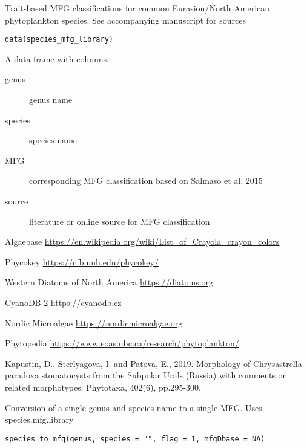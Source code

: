 \documentclass[a4paper]{book}
\begin{document}
%
\begin{Description}\relax
Trait-based MFG classifications for common Eurasion/North American phytoplankton species.
See accompanying manuscript for sources
\end{Description}
%
\begin{Usage}
\begin{verbatim}
data(species_mfg_library)
\end{verbatim}
\end{Usage}
%
\begin{Format}
A data frame with columns:
\begin{description}

\item[genus] genus name
\item[species] species name
\item[MFG] corresponding MFG classification based on Salmaso et al. 2015
\item[source] literature or online source for MFG classification

\end{description}

\end{Format}
%
\begin{References}\relax
Algaebase \url{https://en.wikipedia.org/wiki/List_of_Crayola_crayon_colors}

Phycokey \url{https://cfb.unh.edu/phycokey/}

Western Diatoms of North America \url{https://diatoms.org}

CyanoDB 2 \url{https://cyanodb.cz}

Nordic Microalgae \url{https://nordicmicroalgae.org}

Phytopedia \url{https://www.eoas.ubc.ca/research/phytoplankton/}

Kapustin, D., Sterlyagova, I. and Patova, E., 2019. Morphology of Chrysastrella paradoxa stomatocysts from the Subpolar Urals (Russia) with comments on related morphotypes. Phytotaxa, 402(6), pp.295-300.
\end{References}
%
\begin{Description}\relax
Conversion of a single genus and species name to a single MFG. Uses species.mfg.library
\end{Description}
%
\begin{Usage}
\begin{verbatim}
species_to_mfg(genus, species = "", flag = 1, mfgDbase = NA)
\end{verbatim}
\end{Usage}
\end{document}
